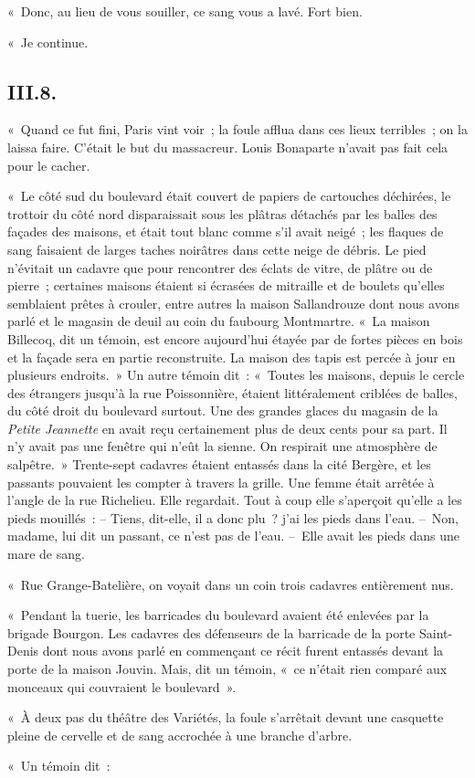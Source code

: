 \documentclass[french,twoside]{book} %
\begin{document}
« Donc, au lieu de vous souiller, ce sang vous a lavé. Fort bien.\par
« Je continue.
\subsection[{III.8.}]{III.8.}
\noindent « Quand ce fut fini, Paris vint voir ; la foule afflua dans ces lieux terribles ; on la laissa faire. C’était le but du massacreur. Louis Bonaparte n’avait pas fait cela pour le cacher.\par
« Le côté sud du boulevard était couvert de papiers de cartouches déchirées, le trottoir du côté nord disparaissait sous les plâtras détachés par les balles des façades des maisons, et était tout blanc comme s’il avait neigé ; les flaques de sang faisaient de larges taches noirâtres dans cette neige de débris. Le pied n’évitait un cadavre que pour rencontrer des éclats de vitre, de plâtre ou de pierre ; certaines maisons étaient si écrasées de mitraille et de boulets qu’elles semblaient prêtes à crouler, entre autres la maison Sallandrouze dont nous avons parlé et le magasin de deuil au coin du faubourg Montmartre. « La maison Billecoq, dit un témoin, est encore aujourd’hui étayée par de fortes pièces en bois et la façade sera en partie reconstruite. La maison des tapis est percée à jour en plusieurs endroits. » Un autre témoin dit : « Toutes les maisons, depuis le cercle des étrangers jusqu’à la rue Poissonnière, étaient littéralement criblées de balles, du côté droit du boulevard surtout. Une des grandes glaces du magasin de la \emph{Petite Jeannette} en avait reçu certainement plus de deux cents pour sa part. Il n’y avait pas une fenêtre qui n’eût la sienne. On respirait une atmosphère de salpêtre. » Trente-sept cadavres étaient entassés dans la cité Bergère, et les passants pouvaient les compter à travers la grille. Une femme était arrêtée à l’angle de la rue Richelieu. Elle regardait. Tout à coup elle s’aperçoit qu’elle a les pieds mouillés : – Tiens, dit-elle, il a donc plu ? j’ai les pieds dans l’eau. – Non, madame, lui dit un passant, ce n’est pas de l’eau. – Elle avait les pieds dans une mare de sang.\par
« Rue Grange-Batelière, on voyait dans un coin trois cadavres entièrement nus.\par
« Pendant la tuerie, les barricades du boulevard avaient été enlevées par la brigade Bourgon. Les cadavres des défenseurs de la barricade de la porte Saint-Denis dont nous avons parlé en commençant ce récit furent entassés devant la porte de la maison Jouvin. Mais, dit un témoin, « ce n’était rien comparé aux monceaux qui couvraient le boulevard ».\par
« À deux pas du théâtre des Variétés, la foule s’arrêtait devant une casquette pleine de cervelle et de sang accrochée à une branche d’arbre.\par
« Un témoin dit :\par
\end{document}
